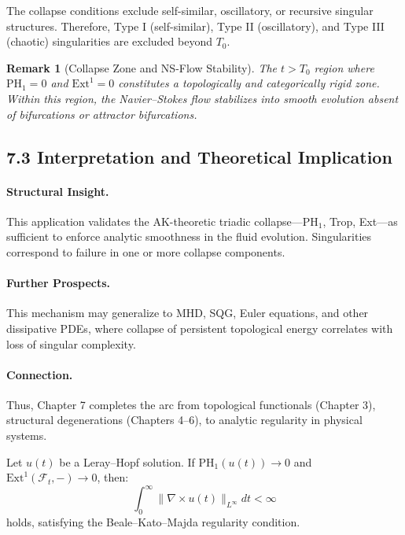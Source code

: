 \documentclass[11pt]{article}
\newtheorem{remark}[theorem]{Remark}
\begin{document}
\begin{corollary}
The collapse conditions exclude self-similar, oscillatory, or recursive singular structures. Therefore, Type I (self-similar), Type II (oscillatory), and Type III (chaotic) singularities are excluded beyond $T_0$.
\end{corollary}

\begin{remark}[Collapse Zone and NS-Flow Stability]
The $t > T_0$ region where $\mathrm{PH}_1 = 0$ and $\mathrm{Ext}^1 = 0$ constitutes a topologically and categorically rigid zone. Within this region, the Navier--Stokes flow stabilizes into smooth evolution absent of bifurcations or attractor bifurcations.
\end{remark}

\subsection{7.3 Interpretation and Theoretical Implication}

\paragraph{Structural Insight.}
This application validates the AK-theoretic triadic collapse—PH$_1$, Trop, Ext—as sufficient to enforce analytic smoothness in the fluid evolution. Singularities correspond to failure in one or more collapse components.

\paragraph{Further Prospects.}
This mechanism may generalize to MHD, SQG, Euler equations, and other dissipative PDEs, where collapse of persistent topological energy correlates with loss of singular complexity.

\paragraph{Connection.}
Thus, Chapter 7 completes the arc from topological functionals (Chapter 3), structural degenerations (Chapters 4–6), to analytic regularity in physical systems.

\begin{lemma}
Let $u(t)$ be a Leray--Hopf solution. If $\mathrm{PH}_1(u(t)) \to 0$ and $\mathrm{Ext}^1(\mathcal{F}_t, -) \to 0$, then:
\[
\int_0^\infty \|\nabla \times u(t)\|_{L^\infty} dt < \infty
\]
holds, satisfying the Beale–Kato–Majda regularity condition.
\end{lemma}
\end{document}
